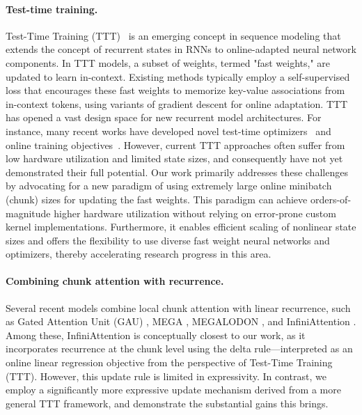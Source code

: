 \documentclass{article}
\begin{document}
\paragraph{Test-time training.} Test-Time Training (TTT)~\cite{sun2024learning}  is an emerging concept in sequence modeling that extends the concept of recurrent states in RNNs to online-adapted neural network components. In TTT models, a subset of weights, termed "fast weights," are updated to learn in-context. Existing methods typically employ a self-supervised loss that encourages these fast weights to memorize key-value associations from in-context tokens, using variants of gradient descent for online adaptation. TTT~\cite{sun2024learning,wang2025testtimeregressionunifyingframework} has opened a vast design space for new recurrent model architectures. For instance, many recent works have developed novel test-time optimizers~\cite{behrouz2024titans, karami2025lattice} and online training objectives~\cite{behrouz2025s}. However, current TTT approaches often suffer from low hardware utilization and limited state sizes, and consequently have not yet demonstrated their full potential.  Our work primarily addresses these challenges by advocating for a new paradigm of using extremely large online minibatch (chunk) sizes for updating the fast weights. This paradigm can achieve orders-of-magnitude higher hardware utilization without relying on error-prone custom kernel implementations. Furthermore, it enables efficient scaling of nonlinear state sizes and offers the flexibility to use diverse fast weight neural networks and optimizers, thereby accelerating research progress in this area.

\paragraph{Combining chunk attention with recurrence.}
Several recent models combine local chunk attention with linear recurrence, such as Gated Attention Unit (GAU) \cite{hua2022transformerqualitylineartime}, MEGA \cite{ma2023mega}, MEGALODON \cite{ma2024megalodon}, and InfiniAttention \cite{munkhdalai2024leavecontextbehindefficient}. Among these, InfiniAttention is conceptually closest to our work, as it incorporates recurrence at the chunk level using the delta rule—interpreted as an online linear regression objective from the perspective of Test-Time Training (TTT). However, this update rule is limited in expressivity. In contrast, we employ a significantly more expressive update mechanism derived from a more general TTT framework, and demonstrate the substantial gains this brings.
\end{document}

